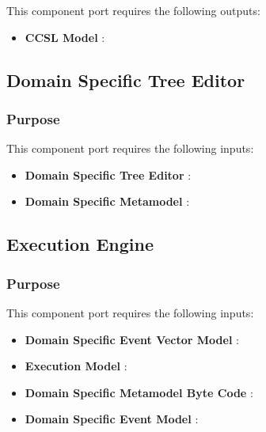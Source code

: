 \documentclass{gemoc} %
\begin{document}
This component port requires the following outputs:
\begin{itemize}
  \item \textbf{CCSL Model} :
\end{itemize}

\subsection{Domain Specific Tree Editor}


\subsubsection{Purpose}

This component port requires the following inputs:
\begin{itemize}
  \item \textbf{Domain Specific Tree Editor} :
  \item \textbf{Domain Specific Metamodel} :
\end{itemize}


\subsection{Execution Engine}


\subsubsection{Purpose}

This component port requires the following inputs:
\begin{itemize}
  \item \textbf{Domain Specific Event Vector Model} :
  \item \textbf{Execution Model} :
  \item \textbf{Domain Specific Metamodel Byte Code} :
  \item \textbf{Domain Specific Event Model} :
\end{itemize}
\end{document}
